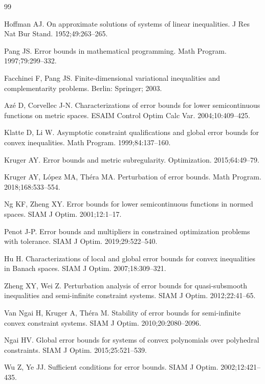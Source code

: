 \documentclass[11pt]{article}
\begin{document}
\begin{thebibliography}{99}	

 Hoffman AJ. On approximate solutions of systems of linear inequalities. J Res Nat Bur Stand. 1952;49:263--265. 


 Pang JS. Error bounds in mathematical programming. Math Program. 1997;79:299--332. 

 Facchinei F, Pang JS. Finite-dimensional variational inequalities and complementarity problems. Berlin: Springer; 2003. 

 Az\'{e} D, Corvellec J-N. Characterizations of error bounds for lower semicontinuous functions on metric spaces. ESAIM Control Optim Calc Var. 2004;10:409--425. 

 Klatte D, Li W. Asymptotic constraint qualifications and global error bounds for convex inequalities. Math Program. 1999;84:137--160. 

 Kruger AY. Error bounds and metric subregularity. Optimization. 2015;64:49--79. 

 Kruger AY, L\'{o}pez MA, Th\'{e}ra MA. Perturbation of error bounds. Math Program. 2018;168:533--554. 

 Ng KF, Zheng XY. Error bounds for lower semicontinuous functions in normed spaces. SIAM J Optim. 2001;12:1--17. 

 Penot J-P. Error bounds and multipliers in constrained optimization problems with tolerance. SIAM J Optim. 2019;29:522--540.

  Hu H. Characterizations of local and global error bounds for convex inequalities in Banach spaces. SIAM J Optim. 2007;18:309--321. 

 Zheng XY, Wei Z. Perturbation analysis of error bounds for quasi-subsmooth inequalities and semi-infinite constraint systems. SIAM J Optim. 2012;22:41--65. 


 Van Ngai H, Kruger A, Th\'{e}ra M. Stability of error bounds for semi-infinite convex constraint systems. SIAM J Optim. 2010;20:2080--2096. 

 Ngai HV. Global error bounds for systems of convex polynomials over polyhedral constraints. SIAM J Optim. 2015;25:521--539. 


 Wu Z, Ye JJ. Sufficient conditions for error bounds. SIAM J Optim. 2002;12:421--435. 



\end{thebibliography}
\end{document}
